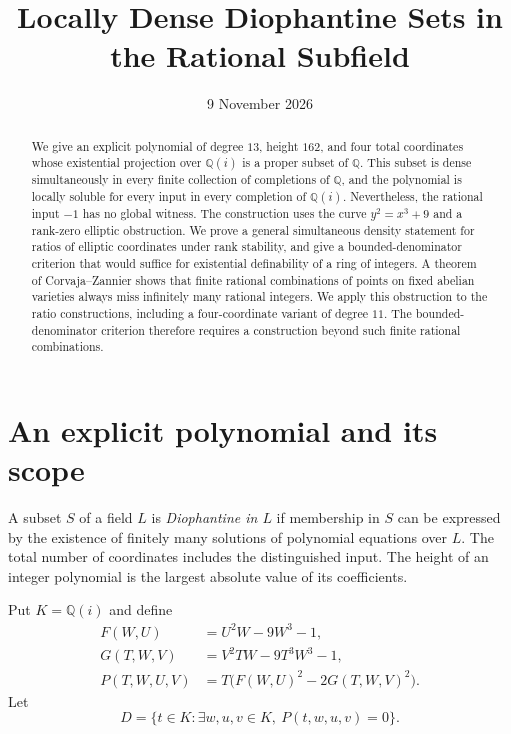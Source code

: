 \documentclass[11pt,a4paper]{article}
\title{Locally Dense Diophantine Sets in the Rational Subfield}
\author{}\date{9 November 2026}
\theoremstyle{definition}
\newcommand{\Q}{\mathbb Q}\newcommand{\Z}{\mathbb Z}
\begin{document}
\maketitle
\begin{abstract}
We give an explicit polynomial of degree $13$, height $162$, and
four total coordinates whose existential projection over $\Q(i)$ is
a proper subset of $\Q$. This subset is dense simultaneously in every
finite collection of completions of $\Q$, and the polynomial is locally
soluble for every input in every completion of $\Q(i)$. Nevertheless,
the rational input $-1$ has no global witness. The construction uses
the curve $y^2=x^3+9$ and a rank-zero elliptic obstruction.
We prove a general simultaneous density statement for ratios of
elliptic coordinates under rank stability, and give a bounded-denominator
criterion that would suffice for existential definability of a ring of
integers. A theorem of Corvaja--Zannier shows that finite rational
combinations of points on fixed abelian varieties always miss infinitely
many rational integers. We apply this obstruction to the ratio
constructions, including a four-coordinate variant of degree $11$.
The bounded-denominator criterion therefore requires a construction
beyond such finite rational combinations.
\end{abstract}

\section{An explicit polynomial and its scope}

A subset $S$ of a field $L$ is \emph{Diophantine in $L$} if membership
in $S$ can be expressed by the existence of finitely many solutions of
polynomial equations over $L$. The total number of coordinates includes
the distinguished input. The height of an integer polynomial is the
largest absolute value of its coefficients.

Put $K=\Q(i)$ and define
\begin{align}
 F(W,U)&=U^2W-9W^3-1,\label{eq:F}\\
 G(T,W,V)&=V^2TW-9T^3W^3-1,\label{eq:G}\\
 P(T,W,U,V)&=T\bigl(F(W,U)^2-2G(T,W,V)^2\bigr).\label{eq:P}
\end{align}
Let
\begin{equation}\label{eq:D-definition}
 D=\{t\in K:\exists w,u,v\in K,\ P(t,w,u,v)=0\}.
\end{equation}
\end{document}
